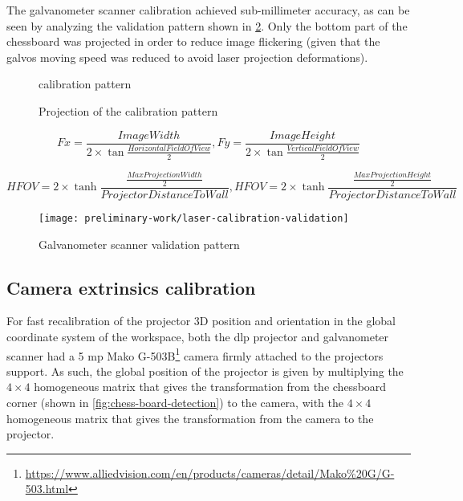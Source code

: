 The galvanometer scanner calibration achieved sub-millimeter accuracy, as can be seen by analyzing the validation pattern shown in \cref{fig:laser-calibration-validation}. Only the bottom part of the chessboard was projected in order to reduce image flickering (given that the galvos moving speed was reduced to avoid laser projection deformations).

\begin{figure}[H]
	\begin{floatrow}[2]
		{\caption{ calibration pattern}\label{fig:laser-ilda-calibration-pattern}}
		{\caption[Projection of the  calibration pattern]{Projection of the  calibration pattern\protect\footnotemark}\label{fig:laser-ilda-calibration-pattern-projected}}
	\end{floatrow}
\end{figure}

\begin{equation}\label{eq:intrinsics-focal-lenghts}
	Fx = \frac{\scriptstyle ImageWidth}{2 \times \tan \frac{HorizontalFieldOfView}{2}},
	Fy = \frac{\scriptstyle ImageHeight}{2 \times \tan \frac{VerticalFieldOfView}{2}}
\end{equation}

\begin{equation}\label{eq:intrinsics-field-of-view}
	HFOV = 2 \times \tanh \frac{\frac{MaxProjectionWidth}{2}}{\scriptstyle ProjectorDistanceToWall},
	HFOV = 2 \times \tanh \frac{\frac{MaxProjectionHeight}{2}}{\scriptstyle ProjectorDistanceToWall}
\end{equation}

\begin{figure}[H]
	\centering
	\texttt{[image: preliminary-work/laser-calibration-validation]}
	\caption{Galvanometer scanner validation pattern}
	\label{fig:laser-calibration-validation}
\end{figure}


\subsection{Camera extrinsics calibration}

For fast recalibration of the projector 3D position and orientation in the global coordinate system of the workspace, both the \gls{dlp} projector and galvanometer scanner had a 5 \gls{mp} Mako G-503B\footnote{\url{https://www.alliedvision.com/en/products/cameras/detail/Mako\%20G/G-503.html}} camera firmly attached to the projectors support. As such, the global position of the projector is given by multiplying the $4 \times 4$ homogeneous matrix that gives the transformation from the chessboard corner (shown in \cref{fig:chess-board-detection}) to the camera, with the $4 \times 4$ homogeneous matrix that gives the transformation from the camera to the projector.


